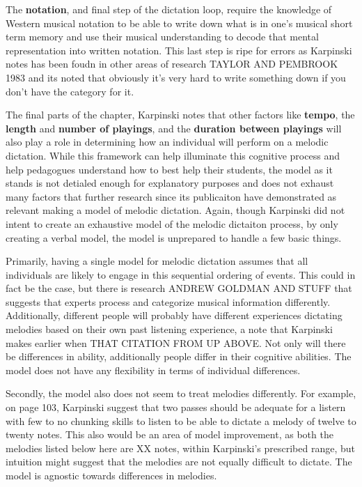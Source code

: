 \documentclass[]{book}
\theoremstyle{definition}
\theoremstyle{definition}
\theoremstyle{definition}
\theoremstyle{remark}
\begin{document}
The \textbf{notation}, and final step of the dictation loop, require the
knowledge of Western musical notation to be able to write down what is
in one's musical short term memory and use their musical understanding
to decode that mental representation into written notation. This last
step is ripe for errors as Karpinski notes has been foudn in other areas
of research TAYLOR AND PEMBROOK 1983 and its noted that obviously it's
very hard to write something down if you don't have the category for it.

The final parts of the chapter, Karpinski notes that other factors like
\textbf{tempo}, the \textbf{length} and \textbf{number of playings}, and
the \textbf{duration between playings} will also play a role in
determining how an individual will perform on a melodic dictation. While
this framework can help illuminate this cognitive process and help
pedagogues understand how to best help their students, the model as it
stands is not detialed enough for explanatory purposes and does not
exhaust many factors that further research since its publicaiton have
demonstrated as relevant making a model of melodic dictation. Again,
though Karpinski did not intent to create an exhaustive model of the
melodic dictaiton process, by only creating a verbal model, the model is
unprepared to handle a few basic things.

Primarily, having a single model for melodic dictation assumes that all
individuals are likely to engage in this sequential ordering of events.
This could in fact be the case, but there is research ANDREW GOLDMAN AND
STUFF that suggests that experts process and categorize musical
information differently. Additionally, different people will probably
have different experiences dictating melodies based on their own past
listening experience, a note that Karpinski makes earlier when THAT
CITATION FROM UP ABOVE. Not only will there be differences in ability,
additionally people differ in their cognitive abilities. The model does
not have any flexibility in terms of individual differences.

Secondly, the model also does not seem to treat melodies differently.
For example, on page 103, Karpinski suggest that two passes should be
adequate for a listern with few to no chunking skills to listen to be
able to dictate a melody of twelve to twenty notes. This also would be
an area of model improvement, as both the melodies listed below here are
XX notes, within Karpinski's prescribed range, but intuition might
suggest that the melodies are not equally difficult to dictate. The
model is agnostic towards differences in melodies.
\end{document}
